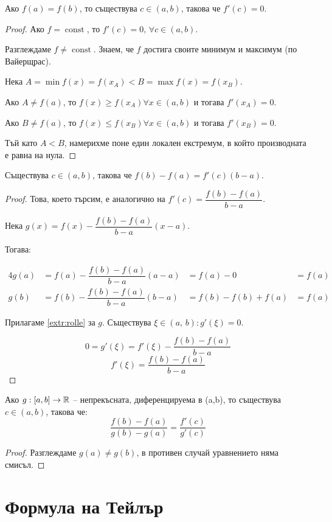 \begin{theorem}\label{extr:rolle}
    Ако $f(a) = f(b)$, то съществува $c \in (a,b)$, такова че $f'(c) = 0$.

    \begin{proof}
        Ако $f = \operatorname{const}$, то $f'(c) = 0,\,\forall c \in (a,b)$.

        Разглеждаме $f \neq \operatorname{const}$.
        Знаем, че $f$ достига своите минимум и максимум (по Вайерщрас).

        Нека $A = \min{f(x)} = f(x_A) < B = \max{f(x)} = f(x_B)$.

        Ако $A \neq f(a)$, то $f(x) \geq f(x_A) \forall x \in (a,b)$ и тогава $f'(x_A) = 0$.

        Ако $B \neq f(a)$, то $f(x) \leq f(x_B) \forall x \in (a,b)$ и тогава $f'(x_B) = 0$.

        Тъй като $A < B$, намерихме поне един локален екстремум, в който производната е равна на нула.
    \end{proof}
\end{theorem}

\begin{theorem}\label{extr:lagrange}
    Съществува $c \in (a,b)$, такова че $f(b)-f(a) = f'(c)(b-a)$.

    \begin{proof}
    Това, което търсим, е аналогично на $f'(c) = \dfrac{f(b)-f(a)}{b-a}$.

    Нека $g(x) = f(x) - \dfrac{f(b)-f(a)}{b-a}(x-a)$.

    Тогава:

    \begin{alignat*}{4}
        g(a) &= f(a) -  \dfrac{f(b)-f(a)}{b-a}(a-a) &= f(a) - 0 &= f(a) \\
        g(b) &= f(b) - \dfrac{f(b)-f(a)}{b-a}(b-a) &= f(b) - f(b) + f(a) &= f(a)
    \end{alignat*}

    Прилагаме \autoref{extr:rolle} за $g$. Съществува $\xi \in (a,\,b): g'(\xi) = 0$.

    \[0 = g'(\xi) = f'(\xi) - \dfrac{f(b)-f(a)}{b-a}\]
    \[f'(\xi) = \dfrac{f(b)-f(a)}{b-a}\]
    \end{proof}
\end{theorem}

\begin{theorem}
    Ако $g : [a,b]\to\mathbb{R}$ -- непрекъсната, диференцируема в (a,b), то съществува $c \in (a,b)$, такова че:
    \[\frac{f(b)-f(a)}{g(b)-g(a)} = \frac{f'(c)}{g'(c)}\]

    \begin{proof}
        Разглеждаме $g(a) \neq g(b)$, в противен случай уравнението няма смисъл.

    \end{proof}
\end{theorem}

\section{Формула на Тейлър}